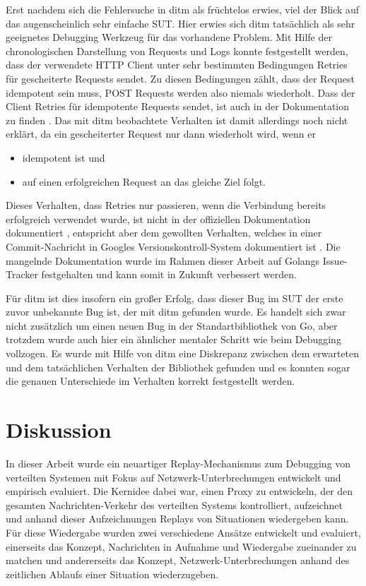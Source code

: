 \documentclass[12pt,a4paper]{report}
\begin{document}
Erst nachdem sich die Fehlersuche in ditm als früchtelos erwies, viel der Blick auf das augenscheinlich sehr einfache SUT.  Hier
erwies sich ditm tatsächlich als sehr geeignetes Debugging Werkzeug für das vorhandene Problem. Mit Hilfe der chronologischen
Darstellung von Requests und Logs konnte festgestellt werden, dass der verwendete HTTP Client unter sehr bestimmten Bedingungen
Retries für gescheiterte Requests sendet. Zu diesen Bedingungen zählt, dass der Request idempotent sein muss, POST Requests werden
also niemals wiederholt. Dass der Client Retries für idempotente Requests sendet, ist auch in der Dokumentation zu finden
\cite{go_transport_docs}. Das mit ditm beobachtete Verhalten ist damit allerdings noch nicht erklärt, da ein gescheiterter Request
nur dann wiederholt wird, wenn er
\begin{itemize}
	\item idempotent ist und
	\item auf einen erfolgreichen Request an das gleiche Ziel folgt.
\end{itemize}
Dieses Verhalten, dass Retries nur passieren, wenn die Verbindung bereits erfolgreich verwendet wurde,
ist nicht in der offiziellen Dokumentation dokumentiert \cite{go_transport_docs}, entspricht aber dem gewollten Verhalten, welches in
einer Commit-Nachricht in Googles Versionskontroll-System dokumentiert ist \cite{go_retry_commit}. Die mangelnde Dokumentation
wurde im Rahmen dieser Arbeit auf Golangs Issue-Tracker festgehalten und kann somit in Zukunft verbessert werden.

Für ditm ist dies insofern ein großer Erfolg, dass dieser Bug im SUT der erste zuvor unbekannte Bug ist, der mit ditm gefunden
wurde. Es handelt sich zwar nicht zusätzlich um einen neuen Bug in der Standartbibliothek von Go, aber trotzdem wurde auch hier
ein ähnlicher mentaler Schritt wie beim Debugging vollzogen. Es wurde mit Hilfe von ditm eine Diskrepanz zwischen dem erwarteten
und dem tatsächlichen Verhalten der Bibliothek gefunden und es konnten sogar die genauen Unterschiede im Verhalten korrekt
festgestellt werden.

\chapter{Diskussion}
\label{chap:discussion}
In dieser Arbeit wurde ein neuartiger Replay-Mechanismus zum Debugging von verteilten Systemen mit Fokus auf
Netzwerk-Unterbrechungen entwickelt und empirisch evaluiert. Die Kernidee dabei war, einen Proxy zu entwickeln, der den gesamten
Nachrichten-Verkehr des verteilten Systems kontrolliert, aufzeichnet und anhand dieser Aufzeichnungen Replays von Situationen
wiedergeben kann. Für diese Wiedergabe wurden zwei verschiedene Ansätze entwickelt und evaluiert, einerseits das Konzept, Nachrichten
in Aufnahme und Wiedergabe zueinander zu matchen und andererseits das Konzept, Netzwerk-Unterbrechungen anhand des zeitlichen
Ablaufs einer Situation wiederzugeben.
\end{document}
